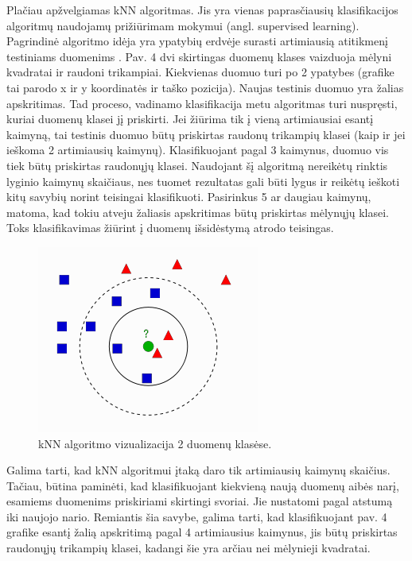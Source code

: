 \documentclass[a4paper,12pt]{article}
\begin{document}
\begin{itemize}
	Plačiau apžvelgiamas kNN algoritmas. Jis yra vienas paprasčiausių klasifikacijos algoritmų naudojamų prižiūrimam mokymui (angl. supervised learning). Pagrindinė algoritmo idėja yra ypatybių erdvėje surasti artimiausią atitikmenį testiniams duomenims \cite{KNN}. Pav. 4 dvi skirtingas duomenų klases vaizduoja mėlyni kvadratai ir raudoni trikampiai. Kiekvienas duomuo turi po 2 ypatybes (grafike tai parodo x ir y koordinatės ir taško pozicija). Naujas testinis duomuo yra žalias apskritimas. Tad proceso, vadinamo klasifikacija metu algoritmas turi nuspręsti, kuriai duomenų klasei jį priskirti. Jei žiūrima tik į vieną artimiausiai esantį kaimyną, tai testinis duomuo būtų priskirtas raudonų trikampių klasei (kaip ir jei ieškoma 2 artimiausių kaimynų). Klasifikuojant pagal 3 kaimynus, duomuo vis tiek būtų priskirtas raudonųjų klasei. Naudojant šį algoritmą nereikėtų rinktis lyginio kaimynų skaičiaus, nes tuomet rezultatas gali būti lygus ir reikėtų ieškoti kitų savybių norint teisingai klasifikuoti. Pasirinkus 5 ar daugiau kaimynų, matoma, kad tokiu atveju žaliasis apskritimas būtų priskirtas mėlynųjų klasei. Toks klasifikavimas žiūrint į duomenų išsidėstymą atrodo teisingas.
		\begin{figure}[H]
			\centering
			\includegraphics[scale=0.6]{images/knn}
			\caption{kNN algoritmo vizualizacija 2 duomenų klasėse.}   %
			\label{img:knn}
		\end{figure}
	Galima tarti, kad kNN algoritmui įtaką daro tik artimiausių kaimynų skaičius. Tačiau, būtina paminėti, kad klasifikuojant kiekvieną naują duomenų aibės narį, esamiems duomenims priskiriami skirtingi svoriai. Jie nustatomi pagal atstumą iki naujojo nario. Remiantis šia savybe, galima tarti, kad klasifikuojant pav. 4 grafike esantį žalią apskritimą pagal 4 artimiausius kaimynus, jis būtų priskirtas raudonųjų trikampių klasei, kadangi šie yra arčiau nei mėlynieji kvadratai.
\end{itemize} 
\end{document}
